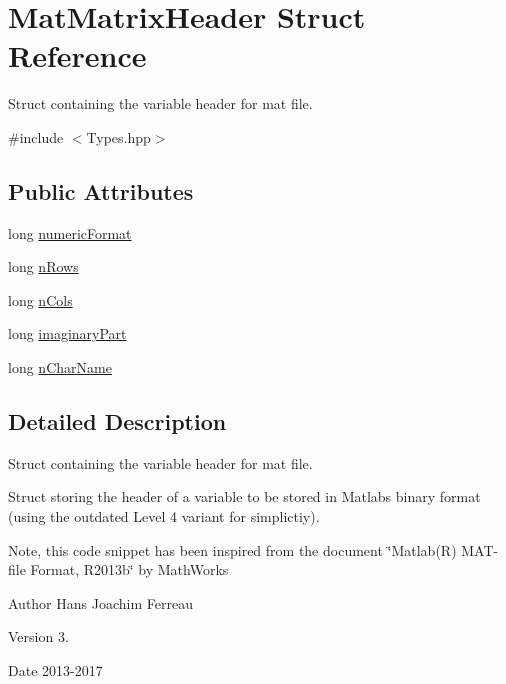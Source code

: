 \hypertarget{struct_mat_matrix_header}{}\section{Mat\+Matrix\+Header Struct Reference}
\label{struct_mat_matrix_header}


Struct containing the variable header for mat file.  




{\ttfamily \#include $<$Types.\+hpp$>$}

\subsection*{Public Attributes}
\begin{DoxyCompactItemize}
\item 
long \hyperlink{struct_mat_matrix_header_ad1279622648e1eb56a46e2822efd2148}{numeric\+Format}
\item 
long \hyperlink{struct_mat_matrix_header_a5972e55ebfaeb4cdbf2b156e0fc36049}{n\+Rows}
\item 
long \hyperlink{struct_mat_matrix_header_a048d7a420034495edc06210f4dcb9e65}{n\+Cols}
\item 
long \hyperlink{struct_mat_matrix_header_a0c30333f318a651595d12c83af04d8f8}{imaginary\+Part}
\item 
long \hyperlink{struct_mat_matrix_header_a73c5bf81c1c4aaa7d26ac787c1fb9d1f}{n\+Char\+Name}
\end{DoxyCompactItemize}


\subsection{Detailed Description}
Struct containing the variable header for mat file. 

Struct storing the header of a variable to be stored in Matlab\textquotesingle{}s binary format (using the outdated Level 4 variant for simplictiy).

Note, this code snippet has been inspired from the document \char`\"{}\+Matlab(\+R) M\+A\+T-\/file Format, R2013b\char`\"{} by Math\+Works

\begin{DoxyAuthor}{Author}
Hans Joachim Ferreau 
\end{DoxyAuthor}
\begin{DoxyVersion}{Version}
3. 
\end{DoxyVersion}
\begin{DoxyDate}{Date}
2013-\/2017 
\end{DoxyDate}


